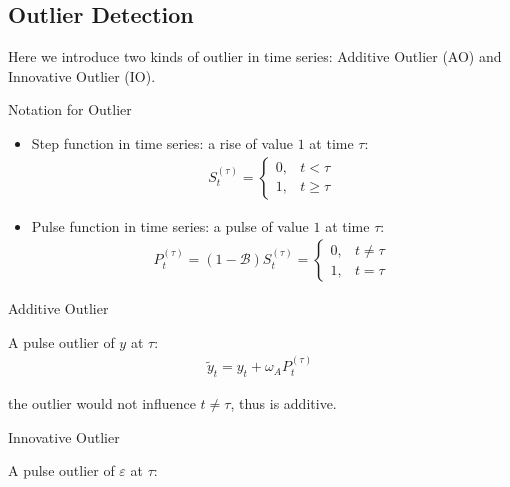     

\subsection{Outlier Detection}
    Here we introduce two kinds of outlier in time series: Additive Outlier (AO) and Innovative Outlier (IO).
    
\begin{point}
    Notation for Outlier
\end{point}

\begin{itemize}[topsep=2pt,itemsep=0pt]
    \item Step function in time series: a rise of value $ 1 $ at time $ \tau $:
    \begin{align}
         S_t^{(\tau)}=\begin{cases}
             0,& t<\tau\\
             1,& t\geq \tau
         \end{cases}
    \end{align}
    \item Pulse function in time series: a pulse of value $ 1 $ at time $ \tau $:
    \begin{align}
        P_t^{(\tau)}=(1-\mathscr{B} ) S_t^{(\tau)}=\begin{cases}
            0,&t\neq \tau\\
            1,&t=\tau
        \end{cases}
    \end{align}

    
\end{itemize}

    

\begin{point}
    Additive Outlier
\end{point}

    A pulse outlier of $ y $ at $ \tau $:
    \begin{align}
        \tilde{y}_t=y_t+\omega _A P_t^{(\tau)} 
    \end{align}

    the outlier would not influence $ t\neq \tau $, thus is additive.

\begin{point}
    Innovative Outlier
\end{point}

    A pulse outlier of $ \varepsilon  $ at $ \tau $:
    
